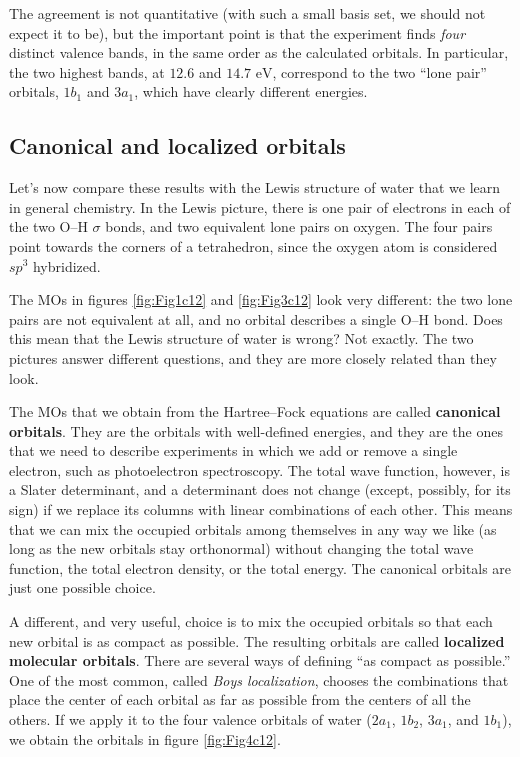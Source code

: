 \documentclass[
  english,
  9pt,
]{extbook}
\theoremstyle{definition}
\theoremstyle{definition}
\theoremstyle{definition}
\theoremstyle{definition}
\theoremstyle{remark}
\begin{document}
The agreement is not quantitative (with such a small basis set, we should not expect it to be), but the important point is that the experiment finds \emph{four} distinct valence bands, in the same order as the calculated orbitals. In particular, the two highest bands, at \(12.6\) and \(14.7\text{ eV}\), correspond to the two ``lone pair'' orbitals, \(1b_1\) and \(3a_1\), which have clearly different energies.

\subsection{Canonical and localized orbitals}\label{canonical-and-localized-orbitals}

Let's now compare these results with the Lewis structure of water that we learn in general chemistry. In the Lewis picture, there is one pair of electrons in each of the two O--H \(\sigma\) bonds, and two equivalent lone pairs on oxygen. The four pairs point towards the corners of a tetrahedron, since the oxygen atom is considered \(sp^3\) hybridized.

The MOs in figures \ref{fig:Fig1c12} and \ref{fig:Fig3c12} look very different: the two lone pairs are not equivalent at all, and no orbital describes a single O--H bond. Does this mean that the Lewis structure of water is wrong? Not exactly. The two pictures answer different questions, and they are more closely related than they look.

The MOs that we obtain from the Hartree--Fock equations are called \textbf{canonical orbitals}. They are the orbitals with well-defined energies, and they are the ones that we need to describe experiments in which we add or remove a single electron, such as photoelectron spectroscopy. The total wave function, however, is a Slater determinant, and a determinant does not change (except, possibly, for its sign) if we replace its columns with linear combinations of each other. This means that we can mix the occupied orbitals among themselves in any way we like (as long as the new orbitals stay orthonormal) without changing the total wave function, the total electron density, or the total energy. The canonical orbitals are just one possible choice.

A different, and very useful, choice is to mix the occupied orbitals so that each new orbital is as compact as possible. The resulting orbitals are called \textbf{localized molecular orbitals}. There are several ways of defining ``as compact as possible.'' One of the most common, called \emph{Boys localization}, chooses the combinations that place the center of each orbital as far as possible from the centers of all the others. If we apply it to the four valence orbitals of water (\(2a_1\), \(1b_2\), \(3a_1\), and \(1b_1\)), we obtain the orbitals in figure \ref{fig:Fig4c12}.
\end{document}
